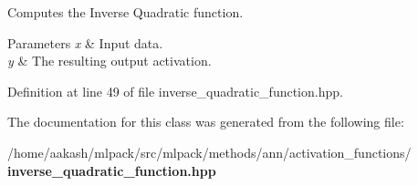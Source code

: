 Computes the Inverse Quadratic function. 


\begin{DoxyParams}{Parameters}
{\em x} & Input data. \\
\hline
{\em y} & The resulting output activation. \\
\hline
\end{DoxyParams}


Definition at line 49 of file inverse\+\_\+quadratic\+\_\+function.\+hpp.



The documentation for this class was generated from the following file\+:\begin{DoxyCompactItemize}
\item 
/home/aakash/mlpack/src/mlpack/methods/ann/activation\+\_\+functions/\textbf{ inverse\+\_\+quadratic\+\_\+function.\+hpp}\end{DoxyCompactItemize}
